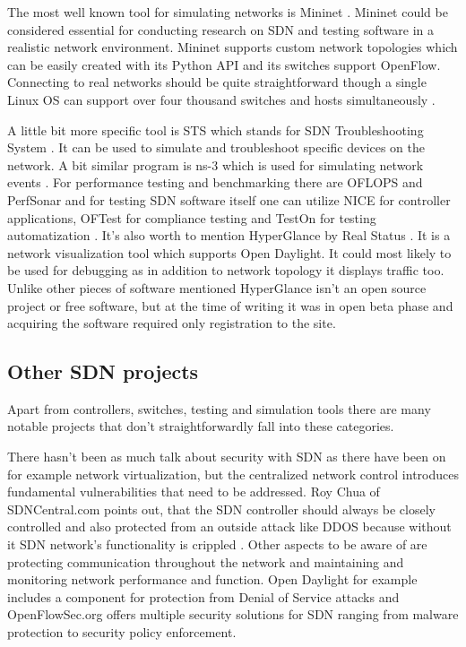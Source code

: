 The most well known tool for simulating networks is Mininet \cite{MN14}. Mininet could be considered essential for conducting research on SDN and testing software in a realistic network environment. Mininet supports custom network topologies which can be easily created with its Python API and its switches support OpenFlow. Connecting to real networks should be quite straightforward though a single Linux OS can support  over four thousand switches and hosts simultaneously \cite{MN14}. 

A little bit more specific tool is STS which stands for SDN Troubleshooting System \cite{STS}. It can be used to simulate and troubleshoot specific devices on the network. A bit similar program is ns-3 which is used for simulating network events \cite{NS3}. For performance testing and benchmarking there are OFLOPS and PerfSonar \cite{OFLOPS, Perf} and for testing SDN software itself one can utilize NICE \cite{NICE} for controller applications, OFTest for compliance testing \cite{OFTest} and TestOn for testing automatization \cite{TestOn}. It’s also worth to mention HyperGlance by Real Status \cite{Hyper}. It is a network visualization tool which supports Open Daylight. It could most likely to be used for debugging as in addition to network topology it displays traffic too. Unlike other pieces of software mentioned HyperGlance isn’t an open source project or free software, but at the time of writing it was in open beta phase and acquiring the software required only registration to the site.

\subsection{Other SDN projects}

Apart from controllers, switches, testing and simulation tools there are many notable projects that don’t straightforwardly fall into these categories.

There hasn’t been as much talk about security with SDN as there have been on for example network virtualization, but the centralized network control introduces fundamental vulnerabilities that need to be addressed. Roy Chua of SDNCentral.com points out, that the SDN controller should always be closely controlled and also protected from an outside attack like DDOS because without it SDN network's functionality is crippled \cite{CHU2} . Other aspects to be aware of are protecting communication throughout the network and maintaining and monitoring network performance and function. Open Daylight for example includes a component for protection from Denial of Service attacks and OpenFlowSec.org offers multiple security solutions for SDN ranging from malware protection to security policy enforcement.

